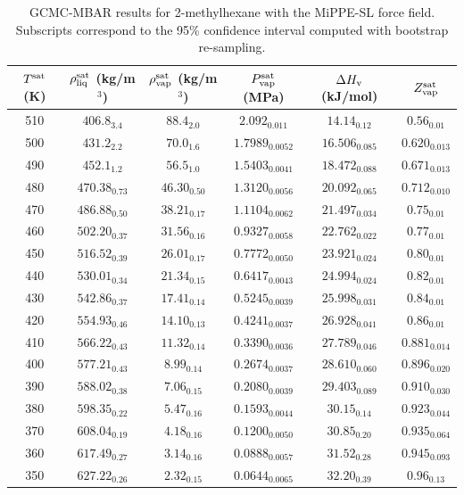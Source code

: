 \documentclass[journal=jctc,manuscript=article]{achemso}
\begin{document}
\begin{table}[htb!]
	\caption{GCMC-MBAR results for 2-methylhexane with the MiPPE-SL force field. Subscripts correspond to the 95\% confidence interval computed with bootstrap re-sampling.}
	\begin{center}
		\begin{tabular}{|c|c|c|c|c|c|}
			\hline
			$T^{\rm sat}$ (K) & $\rho_{\rm liq}^{\rm sat}$ (kg/m$^3$) & $\rho_{\rm vap}^{\rm sat}$ (kg/m$^3$) & $P_{\rm vap}^{\rm sat}$ (MPa) & $\Delta H_{\rm v}$ (kJ/mol) & $Z_{\rm vap}^{\rm sat}$ \\ \hline
			510 & $406.8_{3.4}$ & $88.4_{2.0}$ & $2.092_{0.011}$ & $14.14_{0.12}$ & $0.56_{0.01}$ \\
			500 & $431.2_{2.2}$ & $70.0_{1.6}$ & $1.7989_{0.0052}$ & $16.506_{0.085}$ & $0.620_{0.013}$ \\
			490 & $452.1_{1.2}$ & $56.5_{1.0}$ & $1.5403_{0.0041}$ & $18.472_{0.088}$ & $0.671_{0.013}$ \\
			480 & $470.38_{0.73}$ & $46.30_{0.50}$ & $1.3120_{0.0056}$ & $20.092_{0.065}$ & $0.712_{0.010}$ \\
			470 & $486.88_{0.50}$ & $38.21_{0.17}$ & $1.1104_{0.0062}$ & $21.497_{0.034}$ & $0.75_{0.01}$ \\
			460 & $502.20_{0.37}$ & $31.56_{0.16}$ & $0.9327_{0.0058}$ & $22.762_{0.022}$ & $0.77_{0.01}$ \\
			450 & $516.52_{0.39}$ & $26.01_{0.17}$ & $0.7772_{0.0050}$ & $23.921_{0.024}$ & $0.80_{0.01}$ \\
			440 & $530.01_{0.34}$ & $21.34_{0.15}$ & $0.6417_{0.0043}$ & $24.994_{0.024}$ & $0.82_{0.01}$ \\
			430 & $542.86_{0.37}$ & $17.41_{0.14}$ & $0.5245_{0.0039}$ & $25.998_{0.031}$ & $0.84_{0.01}$ \\
			420 & $554.93_{0.46}$ & $14.10_{0.13}$ & $0.4241_{0.0037}$ & $26.928_{0.041}$ & $0.86_{0.01}$ \\
			410 & $566.22_{0.43}$ & $11.32_{0.14}$ & $0.3390_{0.0036}$ & $27.789_{0.046}$ & $0.881_{0.014}$ \\
			400 & $577.21_{0.43}$ & $8.99_{0.14}$ & $0.2674_{0.0037}$ & $28.610_{0.060}$ & $0.896_{0.020}$ \\
			390 & $588.02_{0.38}$ & $7.06_{0.15}$ & $0.2080_{0.0039}$ & $29.403_{0.089}$ & $0.910_{0.030}$ \\
			380 & $598.35_{0.22}$ & $5.47_{0.16}$ & $0.1593_{0.0044}$ & $30.15_{0.14}$ & $0.923_{0.044}$ \\
			370 & $608.04_{0.19}$ & $4.18_{0.16}$ & $0.1200_{0.0050}$ & $30.85_{0.20}$ & $0.935_{0.064}$ \\
			360 & $617.49_{0.27}$ & $3.14_{0.16}$ & $0.0888_{0.0057}$ & $31.52_{0.28}$ & $0.945_{0.093}$ \\
			350 & $627.22_{0.26}$ & $2.32_{0.15}$ & $0.0644_{0.0065}$ & $32.20_{0.39}$ & $0.96_{0.13}$ \\
			\hline
		\end{tabular}
	\end{center}
\end{table}
\end{document}
